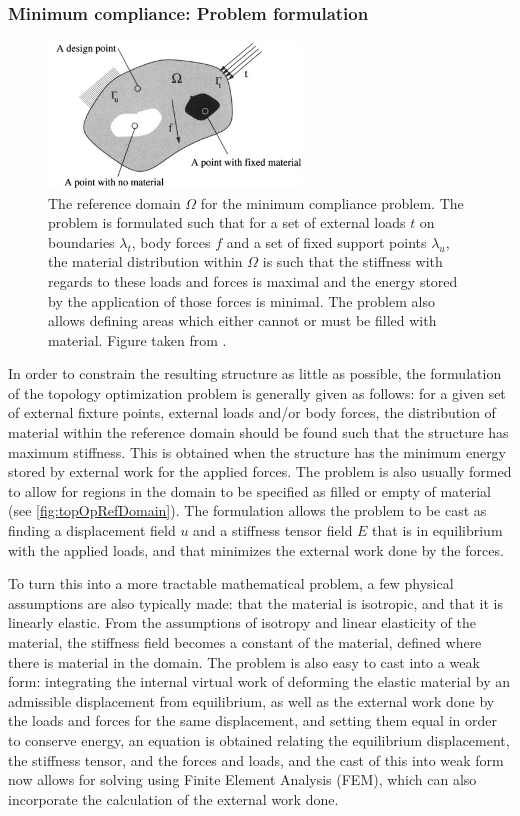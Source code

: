 \subsubsection{Minimum compliance: Problem formulation}
\begin{figure}
\centering
\includegraphics[width=0.6\textwidth]{Pictures/TopOp/design_domain.png}
\caption{The reference domain $\Omega$ for the minimum compliance problem. The problem is formulated such that for a set of external loads $t$ on boundaries $\lambda_t$, body forces $f$ and a set of fixed support points $\lambda_u$, the material distribution within $\Omega$ is such that the stiffness with regards to these loads and forces is maximal and the energy stored by the application of those forces is minimal. The problem also allows defining areas which either cannot or must be filled with material. Figure taken from \cite{bendsoe2003topology}.}
\label{fig:topOpRefDomain}
\end{figure}
In order to constrain the resulting structure as little as possible, the formulation of the topology optimization problem is generally given as follows: for a given set of external fixture points, external loads and/or body forces, the distribution of material within the reference domain should be found such that the structure has maximum stiffness. This is obtained when the structure has the minimum energy stored by external work for the applied forces. The problem is also usually formed to allow for regions in the domain to be specified as filled or empty of material (see \autoref{fig:topOpRefDomain}). The formulation allows the problem to be cast as finding a displacement field $u$ and a stiffness tensor field $E$ that is in equilibrium with the applied loads, and that minimizes the external work done by the forces. 

To turn this into a more tractable mathematical problem, a few physical assumptions are also typically made: that the material is isotropic, and that it is linearly elastic. From the assumptions of isotropy and linear elasticity of the material, the stiffness field becomes a constant of the material, defined where there is material in the domain. The problem is also easy to cast into a weak form: integrating the internal virtual work of deforming the elastic material by an admissible displacement from equilibrium, as well as the external work done by the loads and forces for the same displacement, and setting them equal in order to conserve energy, an equation is obtained relating the equilibrium displacement, the stiffness tensor, and the forces and loads, and the cast of this into weak form now allows for solving using Finite Element Analysis (FEM), which can also incorporate the calculation of the external work done.

